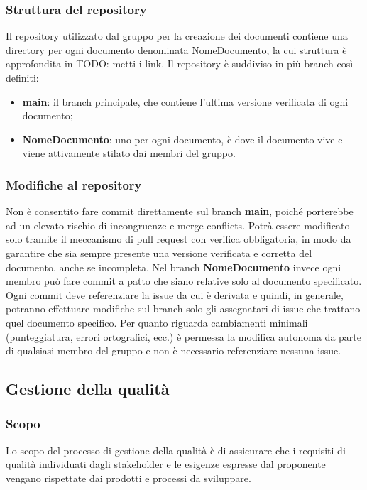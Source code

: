 \subsubsection{Struttura del repository}
Il repository utilizzato dal gruppo per la creazione dei documenti contiene una directory per ogni documento denominata NomeDocumento, la cui struttura è approfondita in TODO: metti i link.
Il repository è suddiviso in più branch così definiti:
\begin{itemize}
\item \textbf{main}: il branch principale, che contiene l'ultima versione verificata di ogni documento;
\item \textbf{NomeDocumento}: uno per ogni documento, è dove il documento vive e viene attivamente stilato dai membri del gruppo.
\end{itemize}

\subsubsection{Modifiche al repository}
Non è consentito fare commit direttamente sul branch \textbf{main}, poiché porterebbe ad un elevato rischio di incongruenze e merge conflicts. Potrà essere modificato solo tramite il meccanismo di pull request con verifica obbligatoria, in modo da garantire che sia sempre presente una versione verificata e corretta del documento, anche se incompleta.
Nel branch \textbf{NomeDocumento} invece ogni membro può fare commit a patto che siano relative solo al documento specificato. Ogni commit deve referenziare la issue da cui è derivata e quindi, in generale, potranno effettuare modifiche sul branch solo gli assegnatari di issue che trattano quel documento specifico. Per quanto riguarda cambiamenti minimali (punteggiatura, errori ortografici, ecc.) è permessa la modifica autonoma da parte di qualsiasi membro del gruppo e non è necessario referenziare nessuna issue.

\subsection{Gestione della qualità}
\subsubsection{Scopo}
Lo scopo del processo di gestione della qualità è di assicurare che i requisiti di qualità individuati dagli stakeholder e le esigenze espresse dal proponente vengano rispettate dai prodotti e processi da sviluppare.

